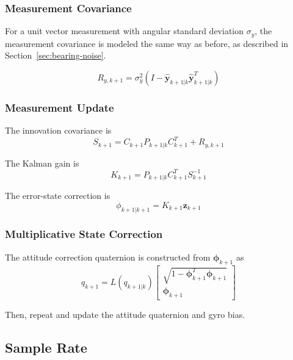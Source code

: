 \documentclass[conference,onecolumn,draftclsnofoot]{IEEEtran}
\begin{document}
\subsubsection{Measurement Covariance}

For a unit vector measurement with angular standard deviation \(\sigma_y\), the measurement covariance is modeled the same way as before, as described in Section~\ref{sec:bearing-noise}.

\begin{equation}
R_{y,k+1}
=
\sigma_y^2
\left(
I
-
\hat{\mathbf y}_{k+1|k}
\hat{\mathbf y}_{k+1|k}^T
\right)
\end{equation}

\subsubsection{Measurement Update}

The innovation covariance is
\begin{equation}
S_{k+1}
=
C_{k+1}
P_{k+1|k}
C_{k+1}^T
+
R_{y,k+1}
\end{equation}

The Kalman gain is
\begin{equation}
K_{k+1}
=
P_{k+1|k}
C_{k+1}^T
S_{k+1}^{-1}
\end{equation}

The error-state correction is
\begin{equation}
\phi_{k+1|k+1}
=
K_{k+1}\mathbf z_{k+1}
\end{equation}

\subsubsection{Multiplicative State Correction}

The attitude correction quaternion is constructed from
$\boldsymbol{\phi}_{k+1}$ as
\begin{equation}
q_{k+1}
=
L(q_{k+1|k})
\begin{bmatrix}
\sqrt{1-\boldsymbol{\phi}_{k+1}^T
\boldsymbol{\phi}_{k+1}}\\
\boldsymbol{\phi}_{k+1}
\end{bmatrix}
\end{equation}

Then, repeat and update the attitude quaternion and gyro bias.

\subsection{Sample Rate}
\end{document}

